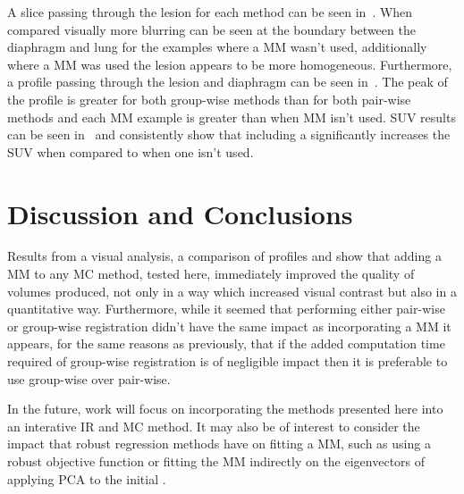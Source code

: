      A slice passing through the lesion for each method can be seen in~. When compared visually more blurring can be seen at the boundary between the diaphragm and lung for the examples where a \gls{MM} wasn't used, additionally where a \gls{MM} was used the lesion appears to be more homogeneous. Furthermore, a profile passing through the lesion and diaphragm can be seen in~. The peak of the profile is greater for both group-wise methods than for both pair-wise methods and each \gls{MM} example is greater than when \gls{MM} isn't used. \gls{SUV} results can be seen in~ and consistently show that including a  significantly increases the \gls{SUV} when compared to when one isn't used.

\vspace{-0.4cm}

\section{Discussion and Conclusions} \label{sec:discussion_and_conclusions}
    Results from a visual analysis, a comparison of profiles and  show that adding a \gls{MM} to any \gls{MC} method, tested here, immediately improved the quality of volumes produced, not only in a way which increased visual contrast but also in a quantitative way. Furthermore, while it seemed that performing either pair-wise or group-wise registration didn't have the same impact as incorporating a \gls{MM} it appears, for the same reasons as previously, that if the added computation time required of group-wise registration is of negligible impact then it is preferable to use group-wise over pair-wise.
    
    In the future, work will focus on incorporating the methods presented here into an interative \gls{IR} and \gls{MC} method. It may also be of interest to consider the impact that robust regression methods have on fitting a \gls{MM}, such as using a robust objective function or fitting the \gls{MM} indirectly on the eigenvectors of applying \gls{PCA} to the initial .
    